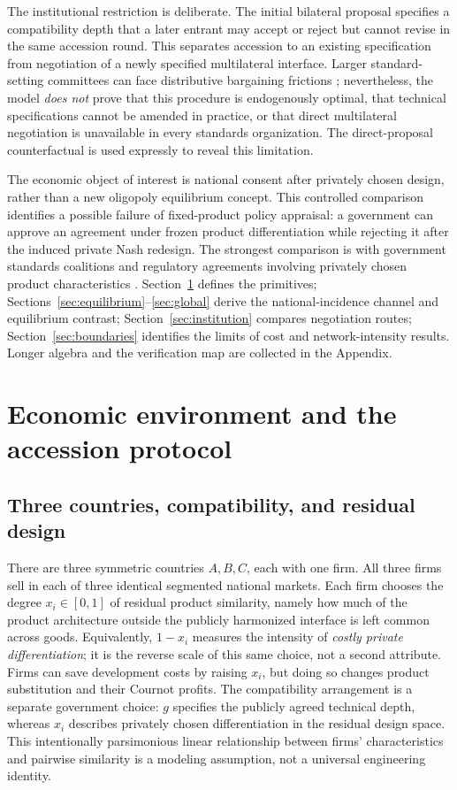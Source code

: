 \documentclass[11pt,a4paper]{article}
\theoremstyle{remark}\newtheorem{remark}[theorem]{Remark}
\begin{document}
The institutional restriction is deliberate. The initial bilateral proposal specifies a compatibility depth that a later entrant may accept or reject but cannot revise in the same accession round. This separates accession to an existing specification from negotiation of a newly specified multilateral interface. Larger standard-setting committees can face distributive bargaining frictions \citep{Simcoe2012}; nevertheless, the model \emph{does not} prove that this procedure is endogenously optimal, that technical specifications cannot be amended in practice, or that direct multilateral negotiation is unavailable in every standards organization. The direct-proposal counterfactual is used expressly to reveal this limitation.

The economic object of interest is national consent after privately chosen design, rather than a new oligopoly equilibrium concept. This controlled comparison identifies a possible failure of fixed-product policy appraisal: a government can approve an agreement under frozen product differentiation while rejecting it after the induced private Nash redesign. The strongest comparison is with government standards coalitions \citep{Takarada2020,Kawabata2021} and regulatory agreements involving privately chosen product characteristics \citep{Grossman2021}. Section~\ref{sec:model} defines the primitives; Sections~\ref{sec:equilibrium}--\ref{sec:global} derive the national-incidence channel and equilibrium contrast; Section~\ref{sec:institution} compares negotiation routes; Section~\ref{sec:boundaries} identifies the limits of cost and network-intensity results. Longer algebra and the verification map are collected in the Appendix.

\section{Economic environment and the accession protocol}\label{sec:model}
\subsection{Three countries, compatibility, and residual design}
There are three symmetric countries $A,B,C$, each with one firm. All three firms sell in each of three identical segmented national markets. Each firm chooses the degree $x_i\in[0,1]$ of residual product similarity, namely how much of the product architecture outside the publicly harmonized interface is left common across goods. Equivalently, $1-x_i$ measures the intensity of \emph{costly private differentiation}; it is the reverse scale of this same choice, not a second attribute. Firms can save development costs by raising $x_i$, but doing so changes product substitution and their Cournot profits. The compatibility arrangement is a separate government choice: $g$ specifies the publicly agreed technical depth, whereas $x_i$ describes privately chosen differentiation in the residual design space. This intentionally parsimonious linear relationship between firms' characteristics and pairwise similarity is a modeling assumption, not a universal engineering identity.
\end{document}
